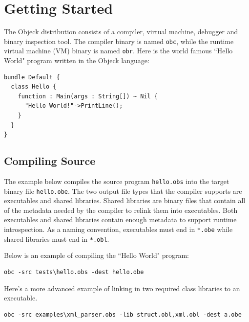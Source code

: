 \documentclass[11pt]{article}
\begin{document}
\section{Getting Started}

The Objeck distribution consists of a compiler, virtual machine,
debugger and binary inspection tool.  The compiler binary is named
\texttt{obc}, while the runtime virtual machine (VM) binary is named
\texttt{obr}.  Here is the world famous ``Hello World" program written
in the Objeck language:

\begin{verbatim}
bundle Default {
  class Hello {
    function : Main(args : String[]) ~ Nil {
      "Hello World!"->PrintLine();
    }
  }
}
\end{verbatim}

\subsection{Compiling Source}
The example below compiles the source program \texttt{hello.obs} into
the target binary file \texttt{hello.obe}.  The two output file types
that the compiler supports are executables and shared libraries.
Shared libraries are binary files that contain all of the metadata
needed by the compiler to relink them into executables.  Both executables
and shared libraries contain enough metadata to support runtime
introspection.  As a naming convention, executables must end in
\texttt{*.obe} while shared libraries must end in \texttt{*.obl}.

Below is an example of compiling the ``Hello World" program:
\begin{verbatim}
obc -src tests\hello.obs -dest hello.obe
\end{verbatim}

Here's a more advanced example of linking in two required class
libraries to an executable.
\begin{verbatim}
obc -src examples\xml_parser.obs -lib struct.obl,xml.obl -dest a.obe
\end{verbatim}
\end{document}
